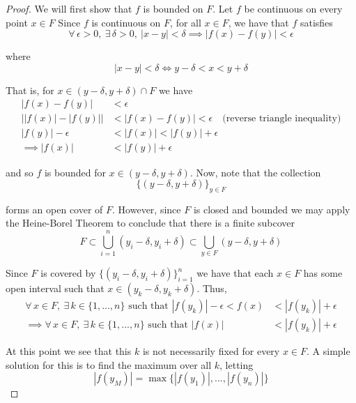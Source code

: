 \documentclass[12pt]{article}
\newlength\tindent
\renewcommand{\indent}{\hspace*{\tindent}}
\begin{document}
\begin{proof} We will first show that $f$ is bounded on $F$. Let $f$ be continuous on every point $x \in F$ Since $f$ is continuous on $F$, for all $x \in F$, we have that $f$ satisfies
\begin{equation*}
	\forall\,\epsilon > 0,~\exists\,\delta > 0,~|x - y| < \delta \implies |f(x) - f(y)| < \epsilon
\end{equation*}

where
\begin{equation*}
	|x - y| < \delta \iff y - \delta < x < y + \delta
\end{equation*}

That is, for $x \in (y - \delta, y + \delta) \cap F$ we have
\begin{align*}
	|f(x) - f(y)| &< \epsilon \\
	\Big| |f(x)| - |f(y)| \Big| &< |f(x) - f(y)| < \epsilon \quad \text{(reverse triangle inequality)} \\
	|f(y)| - \epsilon &< |f(x)| < |f(y)| + \epsilon \\
	\implies |f(x)| &< |f(y)| + \epsilon
\end{align*}

and so $f$ is bounded for $x \in (y - \delta, y + \delta)$. Now, note that the collection 
\begin{equation*}
	\{ (y - \delta, y + \delta) \}_{y \in F}
\end{equation*}

forms an open cover of $F$. However, since $F$ is closed and bounded we may apply the Heine-Borel Theorem to conclude that there is a finite subcover
\begin{equation*}
	F \subset \bigcup^n_{i = 1} (y_i - \delta, y_i + \delta) \subset \bigcup_{y \in F} (y - \delta, y + \delta)
\end{equation*}

\indent Since $F$ is covered by $\{(y_i - \delta, y_i + \delta)\}^n_{i = 1}$ we have that each $x \in F$ has some open interval such that $x \in (y_k - \delta, y_k + \delta)$. Thus,
\begin{align*}
	\forall\,x\in F,~\exists\,k\in \{1,...,n\} \text{ such that } |f(y_k)| - \epsilon < f(x) &< |f(y_k)| + \epsilon \\
	\implies \forall\,x\in F,~\exists\,k\in \{1,...,n\} \text{ such that } |f(x)| &< |f(y_k)| + \epsilon
\end{align*}

\indent At this point we see that this $k$ is not necessarily fixed for every $x \in F$. A simple solution for this is to find the maximum over all $k$, letting
\begin{equation*}
	|f(y_M)| = \max \{|f(y_1)|, ..., |f(y_n)|\}
\end{equation*}


\end{proof}
\end{document}
